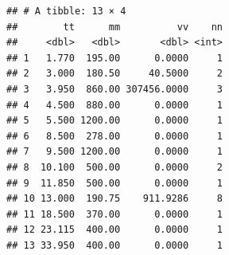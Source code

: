 \documentclass[]{article}
\newenvironment{Shaded}{\begin{snugshade}}{\end{snugshade}}
\newcommand{\KeywordTok}[1]{\textcolor[rgb]{0.13,0.29,0.53}{\textbf{{#1}}}}
\newcommand{\DataTypeTok}[1]{\textcolor[rgb]{0.13,0.29,0.53}{{#1}}}
\newcommand{\DecValTok}[1]{\textcolor[rgb]{0.00,0.00,0.81}{{#1}}}
\newcommand{\StringTok}[1]{\textcolor[rgb]{0.31,0.60,0.02}{{#1}}}
\newcommand{\CommentTok}[1]{\textcolor[rgb]{0.56,0.35,0.01}{\textit{{#1}}}}
\newcommand{\NormalTok}[1]{{#1}}
\begin{document}
\begin{Shaded}
\end{Shaded}

\begin{verbatim}
## # A tibble: 13 × 4
##        tt      mm          vv    nn
##     <dbl>   <dbl>       <dbl> <int>
## 1   1.770  195.00      0.0000     1
## 2   3.000  180.50     40.5000     2
## 3   3.950  860.00 307456.0000     3
## 4   4.500  880.00      0.0000     1
## 5   5.500 1200.00      0.0000     1
## 6   8.500  278.00      0.0000     1
## 7   9.500 1200.00      0.0000     1
## 8  10.100  500.00      0.0000     2
## 9  11.850  500.00      0.0000     1
## 10 13.000  190.75    911.9286     8
## 11 18.500  370.00      0.0000     1
## 12 23.115  400.00      0.0000     1
## 13 33.950  400.00      0.0000     1
\end{verbatim}

\begin{Shaded}
\end{Shaded}
\end{document}
